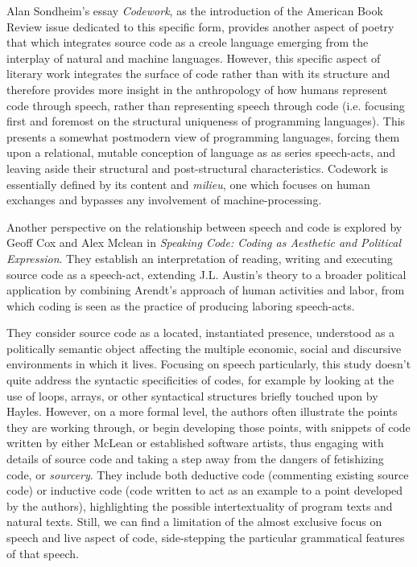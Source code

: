 Alan Sondheim's essay \emph{Codework}\cite{sondheim_introduction_2001}, as the introduction of the American Book Review issue dedicated to this specific form, provides another aspect of poetry that which integrates source code as a creole language emerging from the interplay of natural and machine languages. However, this specific aspect of literary work integrates the surface of code rather than with its structure and therefore provides more insight in the anthropology of how humans represent code through speech, rather than representing speech through code (i.e. focusing first and foremost on the structural uniqueness of programming languages). This presents a somewhat postmodern view of programming languages, forcing them upon a relational, mutable conception of language as as series speech-acts, and leaving aside their structural and post-structural characteristics. Codework is essentially defined by its content and \emph{milieu}, one which focuses on human exchanges and bypasses any involvement of machine-processing.

Another perspective on the relationship between speech and code is explored by Geoff Cox and Alex Mclean in \emph{Speaking Code: Coding as Aesthetic and Political Expression}\cite{cox_speaking_2013}. They establish an interpretation of reading, writing and executing source code as a speech-act, extending J.L. Austin's theory to a broader political application by combining Arendt's approach of human activities and labor\cite{arendt_human_1998}, from which coding is seen as the practice of producing laboring speech-acts.

They consider source code as a located, instantiated presence, understood as a politically semantic object affecting the multiple economic, social and discursive environments in which it lives. Focusing on speech particularly, this study doesn't quite address the syntactic specificities of codes, for example by looking at the use of loops, arrays, or other syntactical structures briefly touched upon by Hayles. However, on a more formal level, the authors often illustrate the points they are working through, or begin developing those points, with snippets of code written by either McLean or established software artists, thus engaging with details of source code and taking a step away from the dangers of fetishizing code, or \emph{sourcery}\cite{chun_sourcery_2008}. They include both deductive code (commenting existing source code) or inductive code (code written to act as an example to a point developed by the authors), highlighting the possible intertextuality of program texts and natural texts. Still, we can find a limitation of the almost exclusive focus on speech and live aspect of code, side-stepping the particular grammatical features of that speech.

